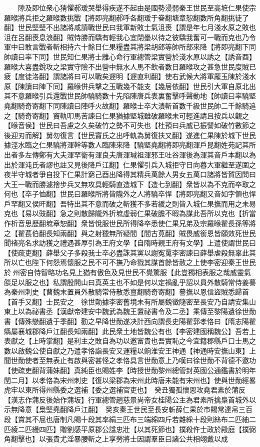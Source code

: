 　　隙及即位衆心猜懼郝瑗哭舉得疾遂不起由是國勢浸弱秦王世民至高墌仁果使宗羅㬋將兵拒之羅㬋數挑戰【將即亮翻郝呼各翻瑗于眷翻塘章恕翻數所角翻挑徒了翻】世民堅壁不出諸將咸請戰世民曰我軍新敗士氣沮喪【謂是年七月淺水原之敗也沮在呂翻喪息浪翻】賊恃勝而驕有輕我心宜閉壘以待之彼驕我奮可一戰而克也乃令軍中曰敢言戰者斬相持六十餘日仁果糧盡其將梁胡郎等帥所部來降【將即亮翻下同帥讀曰率下同】世民知仁果將士離心命行軍總管梁實營於淺水原以誘之【誘音酉】羅㬋大喜盡銳攻之梁實守險不出營中無水人馬不飲者數日羅㬋攻之甚急世民度賊已疲【度徒洛翻】謂諸將曰可以戰矣遟明【遟直利翻】使右武候大將軍龎玉陳於淺水原【陳讀曰陣下同】羅㬋併兵擊之玉戰幾不能支【幾居依翻】世民引大軍自原北出其不意羅㬋引兵還戰世民帥驍騎數十先陷陳唐兵表裏奮擊呼聲動地【帥讀曰率驍堅堯翻騎奇寄翻下同陳讀曰陣呼火故翻】羅㬋士卒大潰斬首數千級世民帥二千餘騎追之【騎奇寄翻】竇軌叩馬苦諫曰仁果猶據堅城雖破羅㬋未可輕進請且按兵以觀之【㬋音侯】世民曰吾慮之久矣破竹之勢不可失也【杜預曰兵威已振譬如破竹數節之後迎刃而解】舅勿復言【世民竇氏之出呼軌為舅復扶又翻】遂進仁果陳於城下世民據涇水臨之仁果驍將渾幹等數人臨陳來降【驍堅堯翻將即亮翻渾戶昆翻姓苑記其所出者多左傳鄭有大夫渾罕衛有渾良夫唐渾瑊祖渾邪王吐谷渾後為渾其音戶本翻以為出於渾沌氏者謬也註又見後降戶江翻】仁果懼引兵入城拒守日向暮大軍繼至遂圍之夜半守城者爭自投下仁果計窮己酉出降得其精兵萬餘人男女五萬口諸將皆賀因問曰大王一戰而勝遽捨步兵又無攻具輕騎直造城下【造七到翻】衆皆以為不克而卒取之何也【卒子恤翻】世民曰羅㬋所將皆隴外之人將驍卒悍【將即亮翻又音如字領也悍戶罕翻又侯旰翻】吾特出其不意而破之斬獲不多若緩之則皆入城仁果撫而用之未易克也【易以豉翻】急之則散歸隴外折墌虛弱仁果破膽不暇為謀此吾所以克也【折當作析音思歷翻墌章恕翻】衆皆悅服世民所得降卒悉使仁果兄弟及宗羅㬋翟長孫等將之【翟萇伯翻長知兩翻】與之射獵無所疑間【間古莧翻】賊畏威銜恩皆願效死世民聞禇亮名求訪獲之禮遇甚厚引為王府文學【自隋時親王府有文學】上遣使謂世民曰【使疏吏翻】薛舉父子多殺我士卒必盡誅其黨以謝寃䰟李密諫曰薛舉虐殺無辜此其所以亡也陛下何怨焉懷服之民不可不撫乃命戮其謀首餘皆赦之上使李密迎秦王世民於州密自恃智略功名見上猶有傲色及見世民不覺驚服【此豈獨相表服之哉威靈氣燄足以服之也】私謂殷開山曰真英主也不如是何以定禍亂乎詔以員外散騎常侍姜謩為秦州刺史【曹魏末置員外散騎常侍散悉亶翻騎奇寄翻】謩撫以恩信盜賊悉歸首【首手又翻】士民安之　徐世勣據李密舊境未有所屬魏徵隨密至長安乃自請安集山東上以為祕書丞【漢獻帝建安中魏武為魏王置祕書令及二丞】乘傳至黎陽遺徐世勣書【傳殊戀翻遺于季翻】勸之早降世勣遂决計西向謂長史陽翟郭孝恪曰【隋志陽翟縣屬襄城郡降戶江翻長知兩翻】此民衆土地皆魏公有也【李密建國稱魏公】吾若上表獻之【上時掌翻】是利主之敗自為功以邀富貴也吾實恥之今宜籍郡縣戶口士馬之數以啟魏公使自獻之乃遣孝恪詣長安又運糧以餉淮安王神通【神通時安撫山東】上聞世勣使者至無表止有啟與密甚怪之孝恪具言世勣意上乃嘆曰徐世勣不背德不邀功【使疏吏翻背蒲妹翻】真純臣也賜姓李【時授世勣黎州總管封英國公通鑑書於明年閏二月】以孝恪為宋州刺史【復以梁郡為宋州此時唐未能有宋州也】使與世勣經畧虎牢以東所得州縣委之選補【委之選補官吏也】　癸丑獨孤懷恩攻堯君素於蒲反【漢志作蒲反後始作蒲坂】行軍總管趙慈景尚帝女桂陽公主為君素所擒梟首城外以示無降意【梟堅堯翻降戶江翻】　癸亥秦王世民至長安斬薛仁果於市賜常達帛三百段【賞其不屈也唐制凡賜十段其率絹三匹布三端綿四斤若雜綵十段則絲布二匹紬二匹綾二匹縵四匹】贈劉感平原郡公諡忠壯【以其死節也】撲殺仵士政於殿庭【撲弼角翻擊也】以張貴尤淫暴腰斬之上享勞將士因謂羣臣曰諸公共相翊戴以成